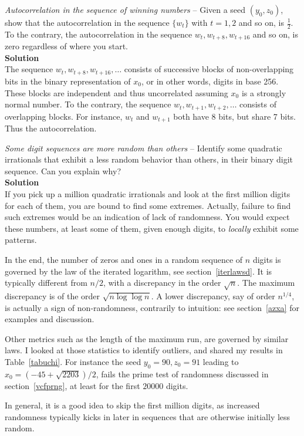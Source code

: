\documentclass[oneside,10pt]{book}
\begin{document}
\begin{Exercise}\label{kn5es} {\em Autocorrelation in the sequence of winning numbers} -- Given a seed
 $(y_0,z_0)$, show that the autocorrelation in the sequence $\{w_t\}$ with $t=1,2$ and so on, is $\frac{1}{2}$.
To the contrary, the autocorrelation in the sequence $w_t, w_{t+8}, w_{t+16}$ and so on, is zero regardless of where you start. \vspace{1ex} \\ 
{\bf Solution} \\
   The sequence $w_t, w_{t+8}, w_{t+16},\dots$ consists of successive blocks of non-overlapping bits in the binary representation of $x_0$, or in other words, digits in base 256. These blocks are independent and thus uncorrelated assuming $x_0$ is a \textcolor{index}{strongly normal} number. To the contrary, the sequence $w_t, w_{t+1}, w_{t+2},\dots$ consists of overlapping
 blocks. For instance, $w_t$ and $w_{t+1}$ both have 8 bits, but share 7 bits. Thus the autocorrelation.
\end{Exercise}

\begin{Exercise}\label{kn5es} {\em Some digit sequences are more random than others} -- Identify some 
 quadratic irrationals that exhibit
 a less random behavior than others, in their binary digit sequence. Can you explain why? \vspace{1ex} \\ 
{\bf Solution} \\
 If you pick up a million quadratic irrationals and look at the first million digits for each of them, you are bound to find some extremes. Actually, failure to find such extremes would be an indication of lack of randomness. You would expect these numbers, at least some of them, given enough digits, to {\em locally} exhibit some patterns. 

In the end, the number of zeros and ones in a random sequence of $n$ digits is governed by the \textcolor{index}{law of the iterated logarithm}, see section~\ref{iterlawsd}. It is typically different from $n/2$, with a discrepancy 
in the order $\sqrt{n}$. The maximum discrepancy is of the order $\sqrt{n\log\log n}$. A lower discrepancy, say of order $n^{1/4}$, is actually a sign of non-randomness, contrarily to intuition: see section~\ref{azxa} for examples and discussion.

Other metrics such as the length of the maximum run, are governed by similar laws. 
 I looked at those statistics to identify outliers, and shared my results in Table~\ref{tabuchi}. For instance
 the seed $y_0=90, z_0=91$ leading to $x_0 = (-45 +\sqrt{2203})/2$, fails the 
\textcolor{index}{prime test of randomness} discussed in section~\ref{vcfprng}, at least for the first $\num{20000}$ digits.

In general, it is a good idea to skip the first million digits, as increased randomness typically kicks in later in sequences that are otherwise initially less random.  
\end{Exercise}
\end{document}
